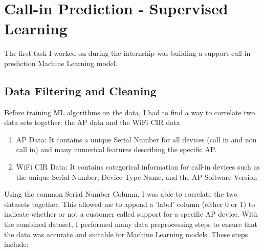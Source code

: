 \documentclass{article}
\begin{document}
\section{Call-in Prediction - Supervised Learning}

The first task I worked on during the internship was building a support call-in prediction Machine Learning model. 

\subsection{Data Filtering and Cleaning}

Before training ML algorithms on the data, I had to find a way to correlate two data sets together: the AP data and the WiFi CIR data

\begin{enumerate}
    \item AP Data: It contains a unique Serial Number for all devices (call in and non call in) and many numerical features describing the specific AP. 
    \item WiFi CIR Data: It contains categorical information for call-in devices such as the unique Serial Number, Device Type Name, and the AP Software Version
\end{enumerate}
Using the common Serial Number Column, I was able to correlate the two datasets together. This allowed me to append a 'label' column (either 0 or 1) to indicate whether or not a customer called support for a specific AP device. With the combined dataset, I performed many data preprocessing steps to ensure that the data was accurate and suitable for  Machine Learning models. These steps include: 
\end{document}
